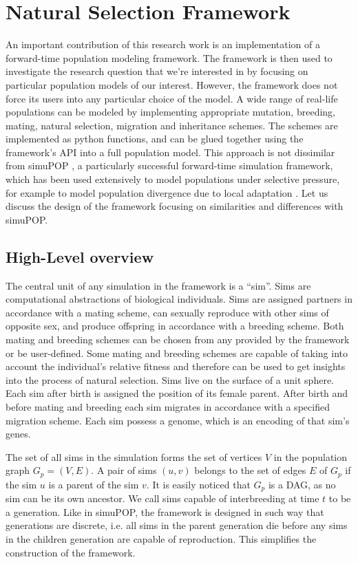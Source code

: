 \documentclass{l4proj}
\begin{document}
\section{Natural Selection Framework}
An important contribution of this research work is an implementation of a forward-time population modeling framework. The framework is then used to investigate the research question that we're interested in by focusing on particular population models of our interest. However, the framework does not force its users into any particular choice of the model. A wide range of real-life populations can be modeled by implementing appropriate mutation, breeding, mating, natural selection, migration and inheritance schemes. The schemes are implemented as python functions, and can be glued together using the framework's API into a full population model. This approach is not dissimilar from simuPOP \parencite{peng05}, a particularly successful forward-time simulation framework, which has been used extensively to model populations under selective pressure, for example to model population divergence due to local adaptation \parencite{naturalSelectionSignatures16}. Let us discuss the design of the framework focusing on similarities and differences with simuPOP.

\subsection{High-Level overview}
The central unit of any simulation in the framework is a ``sim''. Sims are computational abstractions of biological individuals. Sims are assigned partners in accordance with a mating scheme, can sexually reproduce with other sims of opposite sex, and produce offspring in accordance with a breeding scheme. Both mating and breeding schemes can be chosen from any provided by the framework or be user-defined. Some mating and breeding schemes are capable of taking into account the individual's relative fitness and therefore can be used to get insights into the process of natural selection. Sims live on the surface of a unit sphere. Each sim after birth is assigned the position of its female parent. After birth and before mating and breeding each sim migrates in accordance with a specified migration scheme. Each sim possess a genome, which is an encoding of that sim's genes.

The set of all sims in the simulation forms the set of vertices $V$ in the \gls{population graph} $G_{p} = (V, E)$. A pair of sims $(u, v)$ belongs to the set of edges $E$ of $G_{p}$ if the sim $u$ is a parent of the sim $v$. It is easily noticed that $G_{p}$ is a DAG, as no sim can be its own ancestor. We call sims capable of interbreeding at time $t$ to be a generation. Like in simuPOP, the framework is designed in such way that generations are discrete, i.e. all sims in the parent generation die before any sims in the children generation are capable of reproduction. This simplifies the construction of the framework.
\end{document}

